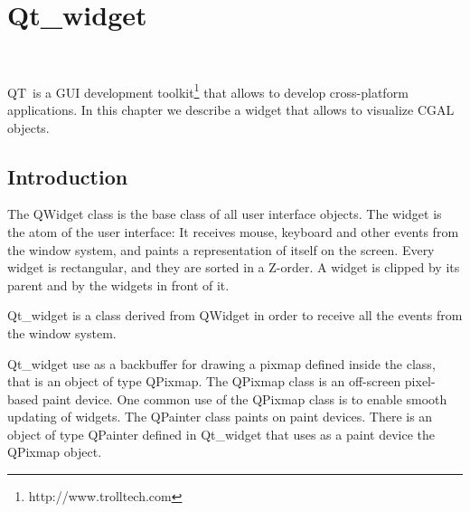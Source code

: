 
\newcommand{\qt}{{\sc QT}}	%

\gdef\lciIfHtmlClassLinks{\lcFalse}
\gdef\lciIfHtmlRefLinks{\lcFalse}
\gdef\lciIfHtmlLinks{\lcFalse}

\chapter{Qt\_widget}
\label{chapterQtwidget}

\\

\qt\ is a GUI development toolkit\footnote{http://www.trolltech.com} that 
allows to develop cross-platform applications. In this chapter we describe a 
widget that allows to visualize CGAL objects.

\section{Introduction}
\label{sectionIntroduction}

The QWidget class is the base class of all user interface objects. The widget
 is the atom of the user interface: It receives mouse, keyboard and other 
events from the window system, and paints a representation of itself on the 
screen. Every widget is rectangular, and they are sorted in a Z-order. A 
widget is clipped by its parent and by the widgets in front of it.

Qt\_widget is a class derived from QWidget in order to receive all the events
from the window system.

Qt\_widget use as a backbuffer for drawing a pixmap
defined inside the class, that is an object of type QPixmap. The QPixmap class
is an off-screen pixel-based paint device. One common use of the QPixmap class
is to enable smooth updating of widgets.
The QPainter class paints on paint devices. There is an object of type 
QPainter defined in Qt\_widget that uses as a paint device the QPixmap object.

